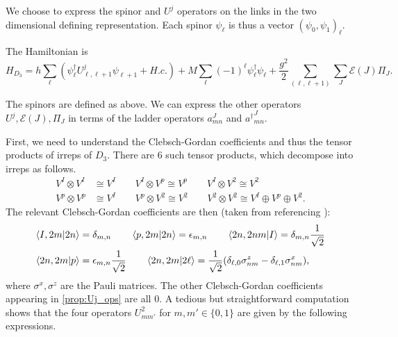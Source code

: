 \documentclass[10pt,reqno]{amsart}
\numberwithin{equation}{section}
\begin{document}
	We choose to express the spinor and $U^j$ operators on the links in the two dimensional defining representation.
	Each spinor $\psi_{\ell}$ is thus a vector $(\psi_0,\psi_1)_\ell$.
	
	The Hamiltonian is
	\begin{equation}
		H_{D_3}=h\sum_\ell (\psi_\ell^\dagger U_{\ell,\ell+1}^j\psi_{\ell+1}+H.c.) + M\sum_\ell (-1)^\ell \psi_\ell^\dagger\psi_\ell+ \frac{g^2}{2} \sum_{(\ell,\ell+1)} \sum_{J} \mathcal{E}(J)\Pi_J.
	\end{equation}
	
	The spinors are defined as above. 
	We can express the other operators $U^j, \mathcal{E}(J),\Pi_J$ in terms of the ladder operators $a^J_{mn}$ and ${a^\dagger}^J_{mn}$.
	
	First, we need to understand the Clebsch-Gordan coefficients and thus the tensor products of irreps of $D_3$. 
	There are 6 such tensor products, which decompose into irreps as follows.
	\begin{align}
		V^I \otimes V^I &\cong V^I \qquad V^I \otimes V^p \cong V^p \qquad V^I \otimes V^2 \cong V^2 \nonumber\\
		V^p \otimes V^p &\cong V^I \qquad V^p \otimes V^2 \cong V^2 \qquad V^2 \otimes V^2 \cong V^I \oplus V^p \oplus V^2.
	\end{align}
	The relevant Clebsch-Gordan coefficients are then (taken from \cite{ZoharBurrello15} referencing \cite{vDBC78}):
	\begin{align}
		\braket{I,2m}{2n} &= \delta_{m,n} \qquad \braket{p,2m}{2n} = \epsilon_{m,n} \qquad \braket{2n,2nm}{I}=\delta_{m,n}\frac{1}{\sqrt{2}} \nonumber\\
		\braket{2n,2m}{p} &= \epsilon_{m,n}\frac{1}{\sqrt{2}} \qquad \braket{2n,2m}{2\ell} =\frac{1}{\sqrt{2}}(\delta_{\ell,0}\sigma^z_{nm}-\delta_{\ell,1}\sigma^x_{nm}),
	\end{align}
	where $\sigma^x,\sigma^z$ are the Pauli matrices.
	The other Clebsch-Gordan coefficients appearing in \cref{prop:Uj_ops} are all 0.
	A tedious but straightforward computation shows that the four operators $U^2_{mm'}$ for $m,m' \in \{0,1\}$ are given by the following expressions.
\end{document}
